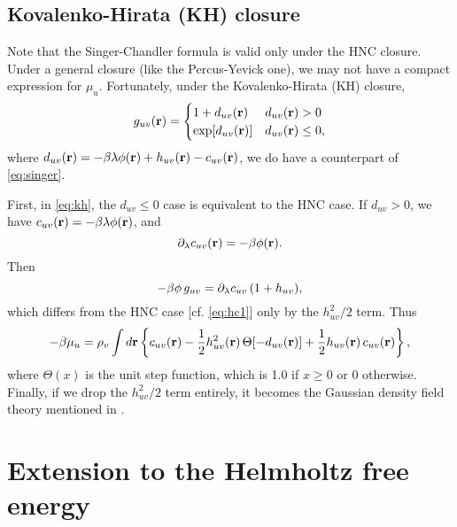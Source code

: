 \documentclass[12pt]{article}
\begin{document}
\subsection{Kovalenko-Hirata (KH) closure}

Note that the Singer-Chandler formula is valid
  only under the HNC closure.
Under a general closure (like the Percus-Yevick one),
  we may not have a compact expression for $\mu_u$.
Fortunately, under the Kovalenko-Hirata (KH) closure,
\begin{equation}
  g_{uv}(\mathbf{r}) =
  \begin{cases}
    1 + d_{uv}(\mathbf{r})
    & d_{uv}(\mathbf{r}) > 0
  \\
    \exp[ d_{uv}(\mathbf{r}) ]
    & d_{uv}(\mathbf{r}) \le 0,
  \end{cases}
  \label{eq:kh}
\end{equation}
where $d_{uv}(\mathbf{r}) = -\beta \lambda \phi(\mathbf{r}) + h_{uv}(\mathbf{r}) - c_{uv}(\mathbf{r})$,
we do have a counterpart of \eqref{eq:singer}.


First, in \eqref{eq:kh}, the $d_{uv} \le 0$ case is equivalent to the HNC case.
%
If $d_{uv} > 0$, we have $c_{uv}(\mathbf{r}) = -\beta \lambda \phi(\mathbf{r})$, and
\[
  \partial_\lambda c_{uv}(\mathbf{r}) = -\beta \phi(\mathbf{r}).
\]
Then
\[
  -\beta \phi \, g_{uv}
  = \partial_\lambda c_{uv} \, (1 + h_{uv}),
\]
which differs from the HNC case [cf. \eqref{eq:hc1}]
  only by the $h_{uv}^2/2$ term.
Thus
%
\begin{equation}
-\beta \mu_u
  =
  \rho_v \int d\mathbf{r}
  \left\{
    c_{uv}(\mathbf{r})
    - \frac{1}{2} h_{uv}^2(\mathbf{r}) \, \Theta[ -d_{uv}(\mathbf{r}) ]
    + \frac{1}{2} h_{uv}(\mathbf{r}) \, c_{uv}(\mathbf{r})
  \right\},
  \label{eq:singer-kh}
\end{equation}
%
where $\Theta(x)$ is the unit step function,
which is 1.0 if $x \ge 0$ or 0 otherwise.
%
Finally, if we drop the $h_{uv}^2/2$ term entirely,
it becomes the Gaussian density field theory mentioned in \cite{singer}.



\section{Extension to the Helmholtz free energy}
\end{document}
